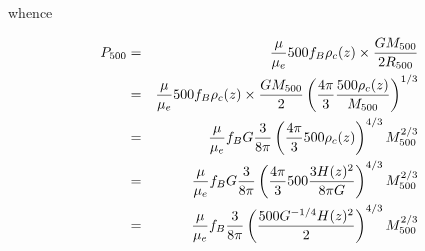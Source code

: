 whence

\begin{eqnarray}\nonumber
\P500 &=& {{\mu}\over{\mu_e}} 500 f_B\rho_c(z) \times {{G \M500}\over{2\R500}}\\\nonumber
      &=& {{\mu}\over{\mu_e}} 500 f_B\rho_c(z) \times {{G\M500}\over{2}} \left({{4\pi}\over{3}}{500\rho_c(z)\over{\M500}}\right)^{1/3}\\\nonumber
      &=& {{\mu}\over{\mu_e}} f_B G {{3}\over{8\pi}} \left( {{4\pi}\over{3}} 500\rho_c(z) \right)^{4/3}\M500^{2/3}\\\nonumber
      &=& {{\mu}\over{\mu_e}} f_B G {{3}\over{8\pi}} \left( {{4\pi}\over{3}} 500 {{3 H(z)^2}\over{8\pi G}} \right)^{4/3}\M500^{2/3}\\
      &=& {{\mu}\over{\mu_e}} f_B {{3}\over{8\pi}} \left( {{500 G^{-1/4} H(z)^2}\over{2}} \right)^{4/3}\M500^{2/3}
\label{eq:p500}
\end{eqnarray}
